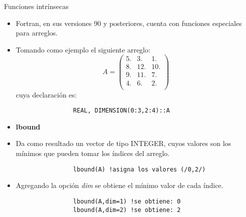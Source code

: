 \begin{frame}[fragile]{Funciones intrínsecas} 
    \begin{itemize}[<+(0)->]
        \item Fortran, en sus versiones 90 y posteriores, cuenta con funciones especiales para arreglos.
        \item [] Tomando como ejemplo el siguiente arreglo:
            $$
                A = \left( \begin{array}{ccc}
                    5.      &  3.   &  1.  \\
                    8.      & 12.   & 10.  \\
                    9.      & 11.   &  7.  \\
                    4.      &  6.   &  2.  \\
                \end{array} \right)
            $$
            cuya declaración es: \\ 
            \vspace{0.1cm}
            \begin{verbatim}
                REAL, DIMENSION(0:3,2:4)::A
            \end{verbatim}
        \item [] \textbf{lbound} 
        \item Da como resultado un vector de tipo INTEGER, cuyos valores son los mínimos que pueden tomar los índices del arreglo.
             \vspace{0.1cm}
            \begin{verbatim}
                lbound(A) !asigna los valores (/0,2/)
            \end{verbatim}
        \item [] Agregando la opción \emph{dim} se obtiene el mínimo valor de cada índice.
            \vspace{0.1cm}
            \begin{verbatim}
                lbound(A,dim=1) !se obtiene: 0
                lbound(A,dim=2) !se obtiene: 2
            \end{verbatim}
    \end{itemize}
\end{frame}


